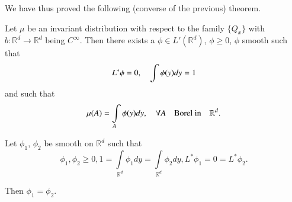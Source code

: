 We have thus proved the following (converse of the previous) theorem.

\begin{theorem*}
Let $\mu$ be an invariant distribution with respect to the family
$\{Q_{x}\}$ with $b:\mathbb{R}^{d}\to \mathbb{R}^{d}$ being
$C^{\infty}$. Then there exists a $\phi \in L'(\mathbb{R}^{d})$,
$\phi\geq 0$, $\phi$ smooth such that
$$
L^{*}\phi=0,\quad \int \phi(y)dy=1
$$
and such that
$$
\mu(A)=\int\limits_{A}\phi(y)dy,\quad \forall A\quad\text{Borel in}\quad
\mathbb{R}^{d}. 
$$
\end{theorem*}

\begin{theorem*}[(Uniqueness)]
Let $\phi_{1}$, $\phi_{2}$ be smooth on $\mathbb{R}^{d}$ such that 
$$
\phi_{1}, \phi_{2}\geq 0,
1=\int\limits_{\mathbb{R}^{d}}\phi_{1}dy=\int\limits_{\mathbb{R}^{d}}\phi_{2}dy,
L^{*}\phi_{1}=0=L^{*}\phi_{2}. 
$$

Then $\phi_{1}=\phi_{2}$.
\end{theorem*}

